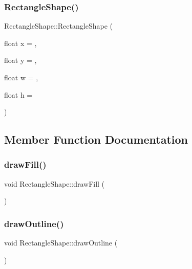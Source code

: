 \subsubsection{\texorpdfstring{Rectangle\+Shape()}{RectangleShape()}}
{\footnotesize\ttfamily Rectangle\+Shape\+::\+Rectangle\+Shape (\begin{DoxyParamCaption}\item[{float}]{x = {},  }\item[{float}]{y = {},  }\item[{float}]{w = {},  }\item[{float}]{h = {} }\end{DoxyParamCaption})}



\subsection{Member Function Documentation}
\hypertarget{class_rectangle_shape_a5981b643c3f26733159e92910eaa25ee}{}\label{class_rectangle_shape_a5981b643c3f26733159e92910eaa25ee} 
\subsubsection{\texorpdfstring{draw\+Fill()}{drawFill()}}
{\footnotesize\ttfamily void Rectangle\+Shape\+::draw\+Fill (\begin{DoxyParamCaption}{ }\end{DoxyParamCaption})}

\hypertarget{class_rectangle_shape_af4c688f1ad48c2ba76970d93d19f5b4b}{}\label{class_rectangle_shape_af4c688f1ad48c2ba76970d93d19f5b4b} 
\subsubsection{\texorpdfstring{draw\+Outline()}{drawOutline()}}
{\footnotesize\ttfamily void Rectangle\+Shape\+::draw\+Outline (\begin{DoxyParamCaption}{ }\end{DoxyParamCaption})}

\hypertarget{class_rectangle_shape_a4788f9784e80e4bfbfa913207d98c558}{}\label{class_rectangle_shape_a4788f9784e80e4bfbfa913207d98c558} 
